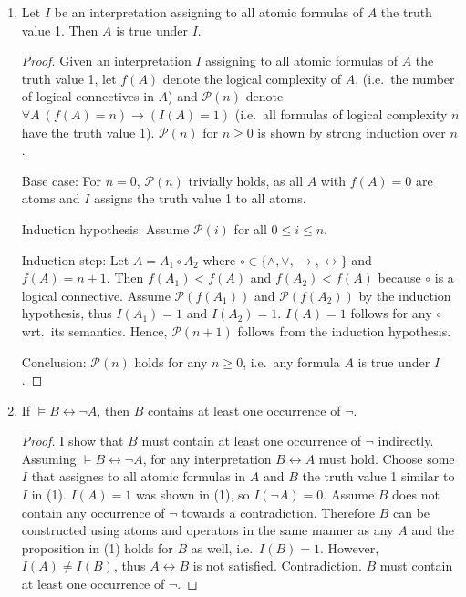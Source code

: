 \documentclass[11pt,a4paper]{article}
\theoremstyle{remark}
\newcommand{\entails}{\models}
\begin{document}
\begin{enumerate}[label=(\arabic*)]
\item Let $I$ be an interpretation assigning to all atomic formulas of $A$ the truth value 1. Then
$A$ is true under $I$.
\begin{proof}Given an interpretation $I$ assigning to all atomic formulas of $A$ the truth value 1, let $f(A)$ denote the logical complexity of $A$, (i.e.~the number of logical connectives in $A$) and $\mathcal{P}(n)$ denote $\forall A \ (f(A) = n) \to (I(A) = 1)$ (i.e.~all formulas of logical complexity $n$ have the truth value 1). $\mathcal{P}(n)$ for $n \geq 0$ is shown by strong induction over $n$.

Base case: For $n = 0$, $\mathcal{P}(n)$ trivially holds, as all $A$ with $f(A) = 0$ are atoms and $I$ assigns the truth value 1 to all atoms.

Induction hypothesis: Assume $\mathcal{P}(i)$ for all $0 \leq i \leq n$.

Induction step: Let $A = A_1 \circ A_2$ where $\circ \in \{\wedge, \vee, \to, \leftrightarrow\}$  and $f(A) = n + 1$. Then $f(A_1) < f(A)$ and $f(A_2) < f(A)$ because $\circ$ is a logical connective. Assume $\mathcal{P}(f(A_1))$ and $\mathcal{P}(f(A_2))$ by the induction hypothesis, thus $I(A_1) = 1$ and $I(A_2) = 1$. $I(A) = 1$ follows for any $\circ$ wrt.~its semantics. Hence, $\mathcal{P}(n+ 1)$ follows from the induction hypothesis.

Conclusion: $\mathcal{P}(n)$ holds for any $n \geq 0$, i.e.~any formula $A$ is true under $I$.
\end{proof}

\item If $\entails B \leftrightarrow \neg A$, then $B$ contains at least one occurrence of $\neg$.
\begin{proof}I show that $B$ must contain at least one occurrence of $\neg$ indirectly. Assuming $\entails B \leftrightarrow \neg A$, for any interpretation $B \leftrightarrow A$ must hold. Choose some $I$ that assignes to all atomic formulas in $A$ and $B$ the truth value 1 similar to $I$ in (1). $I(A) = 1$ was shown in (1), so $I(\neg A) = 0$. Assume $B$ does not contain any occurrence of $\neg$ towards a contradiction. Therefore $B$ can be constructed using atoms and operators in the same manner as any $A$ and the proposition in (1) holds for $B$ as well, i.e.~$I(B) = 1$. However, $I(A) \not = I(B)$, thus $A \leftrightarrow B$ is not satisfied. Contradiction. $B$ must contain at least one occurrence of $\neg$.
\end{proof}
\end{enumerate}
\end{document}
